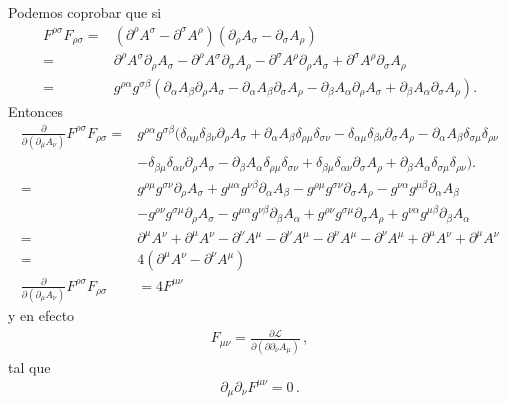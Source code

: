Podemos coprobar que si
\begin{align}
F^{\rho\sigma}F_{\rho\sigma}=&(\partial^\rho A^\sigma-\partial^\sigma A^\rho)(\partial_\rho A_\sigma-\partial_\sigma A_\rho)\nonumber\\
=&\partial^\rho A^\sigma\partial_\rho A_\sigma-\partial^\rho A^\sigma\partial_\sigma A_\rho-\partial^\sigma A^\rho\partial_\rho A_\sigma+\partial^\sigma A^\rho\partial_\sigma
A_\rho\nonumber\\
=&g^{\rho\alpha}g^{\sigma\beta}(\partial_\alpha A_\beta\partial_\rho A_\sigma-\partial_\alpha A_\beta\partial_\sigma A_\rho-\partial_\beta A_\alpha\partial_\rho A_\sigma+\partial_\beta A_\alpha\partial_\sigma A_\rho).\nonumber
\end{align}
Entonces
\begin{align}
  \frac{\partial}{\partial(\partial_\mu A_\nu)}F^{\rho\sigma}F_{\rho\sigma}=&g^{\rho\alpha}g^{\sigma\beta}(\delta_{\alpha\mu}\delta_{\beta\nu}\partial_\rho
  A_\sigma+\partial_\alpha A_\beta\delta_{\rho\mu} \delta_{\sigma\nu}-\delta_{\alpha\mu}\delta_{\beta\nu}\partial_\sigma A_\rho-\partial_\alpha A_\beta\delta_{\sigma\mu}\delta_{\rho\nu}\nonumber\\
&-\delta_{\beta\mu}\delta_{\alpha\nu}\partial_\rho A_\sigma-\partial_\beta A_\alpha\delta_{\rho\mu}\delta_{\sigma\nu}+\delta_{\beta\mu}\delta_{\alpha\nu}\partial_\sigma A_\rho+\partial_\beta
A_\alpha\delta_{\sigma\mu}\delta_{\rho\nu}).\nonumber\\
=&  g^{\rho\mu}g^{\sigma\nu}\partial_\rho A_\sigma+g^{\mu\alpha}g^{\nu\beta}\partial_\alpha A_\beta-g^{\rho\mu}g^{\sigma\nu}\partial_\sigma A_\rho-g^{\nu\alpha}g^{\mu\beta}\partial_\alpha A_\beta\nonumber\\
 &-g^{\rho\nu}g^{\sigma\mu}\partial_\rho A_\sigma-g^{\mu\alpha}g^{\nu\beta}\partial_\beta A_\alpha+g^{\rho\nu}g^{\sigma\mu}\partial_\sigma A_\rho+g^{\nu\alpha}g^{\mu\beta}\partial_\beta A_\alpha\nonumber\\
=&  \partial^\mu A^\nu+\partial^\mu A^\nu-\partial^\nu A^\mu-\partial^\nu A^\mu-\partial^\nu A^\mu-\partial^\nu A^\mu+\partial^\mu A^\nu+\partial^\mu A^\nu\nonumber\\
=&4(\partial^\mu A^\nu-\partial^\nu A^\mu) \nonumber\\
\label{eq:dddmufmunu2}
\frac{\partial}{\partial(\partial_\mu A_\nu)}F^{\rho\sigma}F_{\rho\sigma}&=4F^{\mu\nu}
\end{align}
y en efecto
\begin{align}
  F_{\mu\nu}=\frac{\partial \mathcal{L}}{\partial \left(\partial  \partial_{\nu} A_{\mu}\right)}\,,
\end{align}
tal que
\begin{align}
  \partial_{\mu}\partial_{\nu}F^{\mu\nu}=0\,.
\end{align}


